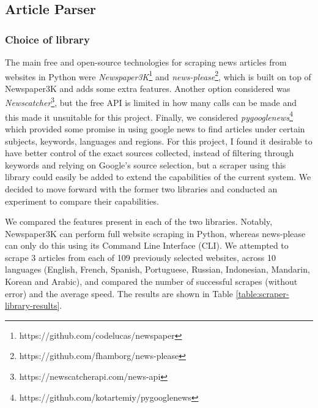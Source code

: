 \documentclass{l4proj}
\begin{document}
\subsection{Article Parser}

\subsubsection{Choice of library} \hfill \par
The main free and open-source technologies for scraping news articles from websites in Python were \emph{Newspaper3K}\footnote{https://github.com/codelucas/newspaper} and \emph{news-please}\footnote{https://github.com/fhamborg/news-please}, which is built on top of Newspaper3K and adds some extra features. Another option considered was \emph{Newscatcher}\footnote{https://newscatcherapi.com/news-api}, but the free API is limited in how many calls can be made and this made it unsuitable for this project. Finally, we considered \emph{pygooglenews}\footnote{https://github.com/kotartemiy/pygooglenews} which provided some promise in using google news to find articles under certain subjects, keywords, languages and regions. For this project, I found it desirable to have better control of the exact sources collected, instead of filtering through keywords and relying on Google's source selection, but a scraper using this library could easily be added to extend the capabilities of the current system. We decided to move forward with the former two libraries and conducted an experiment to compare their capabilities. \par

We compared the features present in each of the two libraries. Notably, Newspaper3K can perform full website scraping in Python, whereas news-please can only do this using its Command Line Interface (CLI). We attempted to scrape 3 articles from each of 109 previously selected websites, across 10 languages (English, French, Spanish, Portuguese, Russian, Indonesian, Mandarin, Korean and Arabic), and compared the number of successful scrapes (without error) and the average speed. The results are shown in Table \ref{table:scraper-library-results}. \par 
\end{document}
